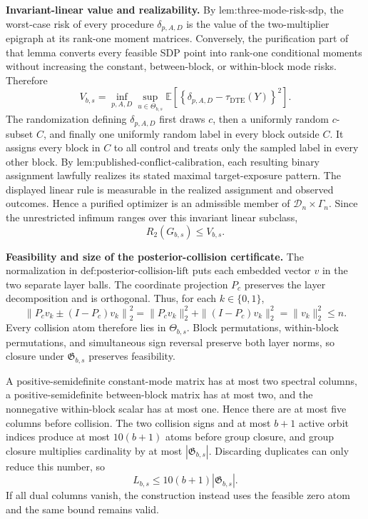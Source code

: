 \textbf{Invariant-linear value and realizability.}
By \(\text{lem:three-mode-risk-sdp}\), the worst-case risk of every procedure \(\delta_{p,A,D}\) is the value of the two-multiplier epigraph at its rank-one moment matrices. Conversely, the purification part of that lemma converts every feasible SDP point into rank-one conditional moments without increasing the constant, between-block, or within-block mode risks. Therefore
\[
V_{b,s}
=\inf_{p,A,D}\sup_{u\in\Theta_{b,s}}
\mathbb E\!\left[\left\{\delta_{p,A,D}-\tau_{\mathrm{DTE}}(Y)\right\}^2\right].
\]
The randomization defining \(\delta_{p,A,D}\) first draws \(c\), then a uniformly random \(c\)-subset \(C\), and finally one uniformly random label in every block outside \(C\). It assigns every block in \(C\) to all control and treats only the sampled label in every other block. By \(\text{lem:published-conflict-calibration}\), each resulting binary assignment lawfully realizes its stated maximal target-exposure pattern. The displayed linear rule is measurable in the realized assignment and observed outcomes. Hence a purified optimizer is an admissible member of \(\mathcal D_n\times\Gamma_n\). Since the unrestricted infimum ranges over this invariant linear subclass,
\[
R_2(G_{b,s})\leq V_{b,s}.
\]

\textbf{Feasibility and size of the posterior-collision certificate.}
The normalization in \(\text{def:posterior-collision-lift}\) puts each embedded vector \(v\) in the two separate layer balls. The coordinate projection \(P_c\) preserves the layer decomposition and is orthogonal. Thus, for each \(k\in\{0,1\}\),
\[
\left\|P_cv_k\mathbin{\pm}(I-P_c)v_k\right\|_2^2
=\|P_cv_k\|_2^2+\|(I-P_c)v_k\|_2^2
=\|v_k\|_2^2\leq n.
\]
Every collision atom therefore lies in \(\Theta_{b,s}\). Block permutations, within-block permutations, and simultaneous sign reversal preserve both layer norms, so closure under \(\mathfrak G_{b,s}\) preserves feasibility.

A positive-semidefinite constant-mode matrix has at most two spectral columns, a positive-semidefinite between-block matrix has at most two, and the nonnegative within-block scalar has at most one. Hence there are at most five columns before collision. The two collision signs and at most \(b+1\) active orbit indices produce at most \(10(b+1)\) atoms before group closure, and group closure multiplies cardinality by at most \(|\mathfrak G_{b,s}|\). Discarding duplicates can only reduce this number, so
\[
L_{b,s}\leq 10(b+1)|\mathfrak G_{b,s}|.
\]
If all dual columns vanish, the construction instead uses the feasible zero atom and the same bound remains valid.

